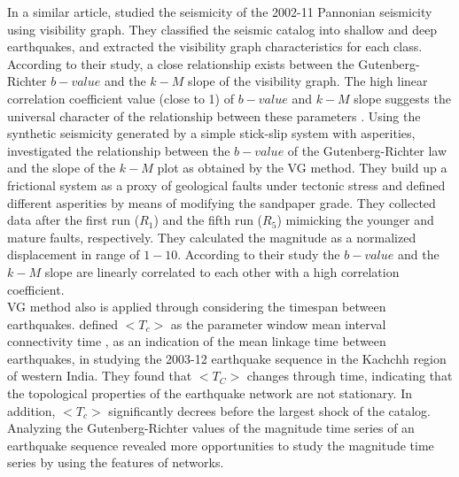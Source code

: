 In a similar article, \citet{Telesca2014} studied the seismicity of the 2002-11 Pannonian seismicity using visibility graph. They classified the seismic catalog into shallow and deep earthquakes, and extracted the visibility graph characteristics for each class. According to their study, a close relationship exists between the Gutenberg-Richter $b-value$ and the $k-M$ slope of the visibility graph. The high linear correlation coefficient value (close to 1) of $b-value$ and $k-M$  slope suggests the universal character of the relationship between these parameters \citep{Telesca2014}.  Using the synthetic seismicity generated by a simple stick-slip system with asperities, \citet{Telesca2014-pone} investigated the relationship between the $b-value$ of the Gutenberg-Richter law and the slope of the $k-M$ plot as obtained by the VG method. They build up a frictional system as a proxy of geological faults under tectonic stress and defined different asperities by means of modifying the sandpaper grade. They collected data after the first run ($R_1$) and the fifth run ($R_5$) mimicking the younger and mature faults, respectively. They calculated the magnitude as a normalized displacement in range of $1-10$. According to their study the $b-value$ and the $k-M$ slope are linearly correlated to each other with a high correlation coefficient.\\
\noindent
VG method also is applied through considering the timespan between earthquakes. \citet{Telesca2016}   defined    $<T_c>$  as the parameter window mean interval connectivity time ,  as an indication of the mean linkage time between earthquakes, in studying the 2003-12 earthquake sequence in the Kachchh region of western India. They found that  $<T_C>$  changes through time, indicating that the topological properties of the earthquake network are not stationary. In addition,  $<T_c>$  significantly decrees before the largest shock of the catalog. Analyzing the Gutenberg-Richter values of  the magnitude time series of an earthquake sequence revealed more opportunities to study the magnitude time series by using the features of networks. 
\noindent

